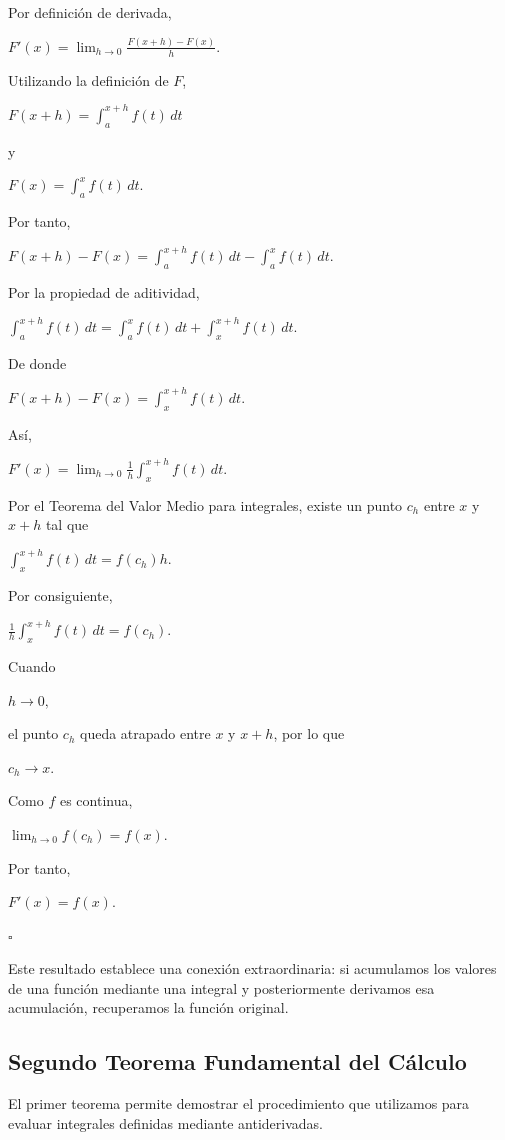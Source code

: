 \documentclass[12pt]{article}
\begin{document}
Por definición de derivada,

$
F'(x)
=
\lim_{h\to0}
\frac{F(x+h)-F(x)}{h}.
$

Utilizando la definición de $F$,

$
F(x+h)
=
\int_a^{x+h}f(t)\,dt
$

y

$
F(x)
=
\int_a^x f(t)\,dt.
$

Por tanto,

$
F(x+h)-F(x)
=
\int_a^{x+h}f(t)\,dt
-
\int_a^x f(t)\,dt.
$

Por la propiedad de aditividad,

$
\int_a^{x+h}f(t)\,dt
=
\int_a^x f(t)\,dt
+
\int_x^{x+h}f(t)\,dt.
$

De donde

$
F(x+h)-F(x)
=
\int_x^{x+h}f(t)\,dt.
$

Así,

$
F'(x)
=
\lim_{h\to0}
\frac{1}{h}
\int_x^{x+h}f(t)\,dt.
$

Por el Teorema del Valor Medio para integrales, existe un punto $c_h$
entre $x$ y $x+h$ tal que

$
\int_x^{x+h}f(t)\,dt
=
f(c_h)h.
$

Por consiguiente,

$
\frac{1}{h}
\int_x^{x+h}f(t)\,dt
=
f(c_h).
$

Cuando

$
h\to0,
$

el punto $c_h$ queda atrapado entre $x$ y $x+h$, por lo que

$
c_h\to x.
$

Como $f$ es continua,

$
\lim_{h\to0}f(c_h)=f(x).
$

Por tanto,

$
\boxed{
F'(x)=f(x).
}
$

\hfill$\square$

Este resultado establece una conexión extraordinaria: si acumulamos los
valores de una función mediante una integral y posteriormente derivamos
esa acumulación, recuperamos la función original.

\subsection*{Segundo Teorema Fundamental del Cálculo}

El primer teorema permite demostrar el procedimiento que utilizamos para
evaluar integrales definidas mediante antiderivadas.
\end{document}
